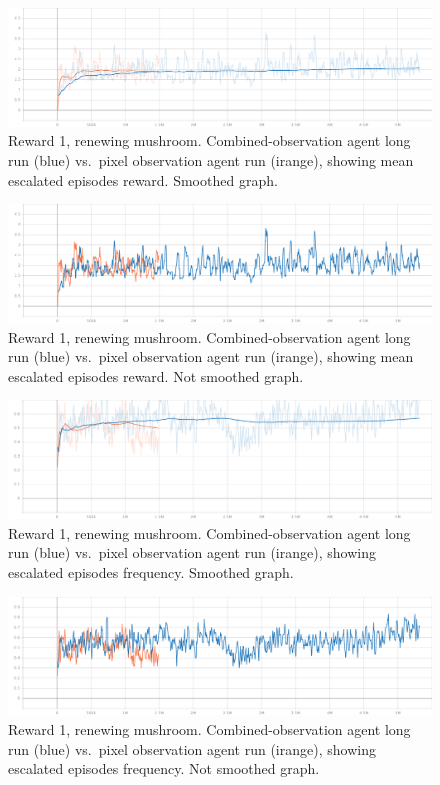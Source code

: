 \documentclass[]{article}
\begin{document}
\begin{figure}
\centering
\includegraphics{./img/114085778-18a50280-98b2-11eb-804c-ea5656675625.png}
\caption{Reward 1, renewing mushroom. Combined-observation agent long
run (blue) vs.~pixel observation agent run (irange), showing mean
escalated episodes reward. Smoothed graph.}
\end{figure}

\begin{figure}
\centering
\includegraphics{./img/114085813-2490c480-98b2-11eb-8abb-0a5477ab4140.png}
\caption{Reward 1, renewing mushroom. Combined-observation agent long
run (blue) vs.~pixel observation agent run (irange), showing mean
escalated episodes reward. Not smoothed graph.}
\end{figure}

\begin{figure}
\centering
\includegraphics{./img/114085848-31adb380-98b2-11eb-8d23-7ab1e36eae2a.png}
\caption{Reward 1, renewing mushroom. Combined-observation agent long
run (blue) vs.~pixel observation agent run (irange), showing escalated
episodes frequency. Smoothed graph.}
\end{figure}

\begin{figure}
\centering
\includegraphics{./img/114085952-543fcc80-98b2-11eb-924b-a9e7ebf03cac.png}
\caption{Reward 1, renewing mushroom. Combined-observation agent long
run (blue) vs.~pixel observation agent run (irange), showing escalated
episodes frequency. Not smoothed graph.}
\end{figure}
\end{document}
